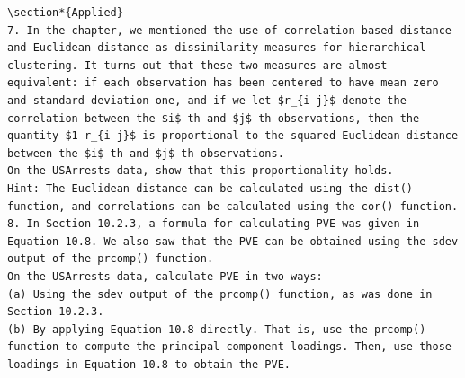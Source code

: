 \documentclass[10pt]{article}
\begin{document}
\begin{verbatim}
\section*{Applied}
7. In the chapter, we mentioned the use of correlation-based distance and Euclidean distance as dissimilarity measures for hierarchical clustering. It turns out that these two measures are almost equivalent: if each observation has been centered to have mean zero and standard deviation one, and if we let $r_{i j}$ denote the correlation between the $i$ th and $j$ th observations, then the quantity $1-r_{i j}$ is proportional to the squared Euclidean distance between the $i$ th and $j$ th observations.
On the USArrests data, show that this proportionality holds.
Hint: The Euclidean distance can be calculated using the dist() function, and correlations can be calculated using the cor() function.
8. In Section 10.2.3, a formula for calculating PVE was given in Equation 10.8. We also saw that the PVE can be obtained using the sdev output of the prcomp() function.
On the USArrests data, calculate PVE in two ways:
(a) Using the sdev output of the prcomp() function, as was done in Section 10.2.3.
(b) By applying Equation 10.8 directly. That is, use the prcomp() function to compute the principal component loadings. Then, use those loadings in Equation 10.8 to obtain the PVE.


\end{verbatim}
\end{document}
